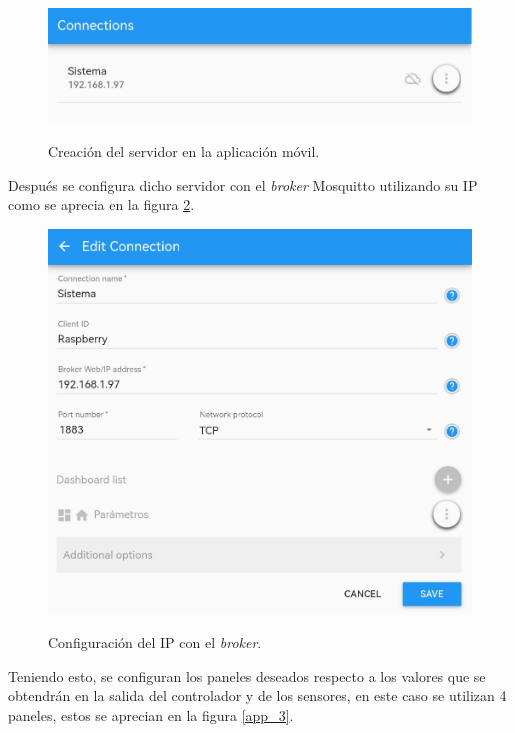 \begin{figure}[H]
\centering
         \includegraphics[scale=0.45]{imgs/APP_2.png} \\
    \caption{Creación del servidor en la aplicación móvil.}\label{app_1}
\end{figure}
Después se configura dicho servidor con el \textit{broker} Mosquitto utilizando su IP como se aprecia en la figura \ref{app_2}. 
\begin{figure}[H]
\centering
         \includegraphics[scale=0.45]{imgs/APP_3.png} \\
    \caption{Configuración del IP con el \textit{broker}.}\label{app_2}
\end{figure}

Teniendo esto, se configuran los paneles deseados respecto a los valores que se obtendrán en la salida del controlador y de los sensores, en este caso se utilizan 4 paneles, estos se aprecian en la figura \ref{app_3}.

